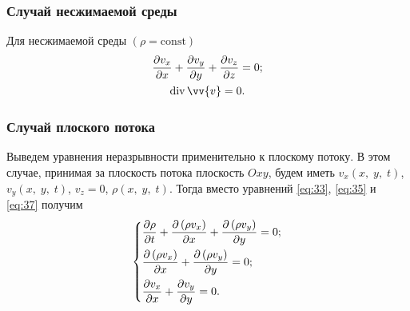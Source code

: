 	\subsubsection{Случай несжимаемой среды}
	Для несжимаемой среды $\left(\rho = \mathrm{const}\right)$
	\begin{gather}
		\frac{\pp v_x}{\pp x} + \frac{\pp v_y}{\pp y} + \frac{\pp v_z}{\pp z} = 0;\label{eq:37}\\
		\diverg\vv{v} = 0.\label{eq:38}
	\end{gather}
	
	\subsubsection{Случай плоского потока}
	Выведем уравнения неразрывности применительно к плоскому потоку. В этом случае, принимая за плоскость потока плоскость $Oxy$, будем иметь $v_x\left(x,\; y,\; t\right)$, $v_y\left(x,\; y,\; t\right)$, $v_z = 0$, $\rho\left(x,\; y,\; t\right)$. Тогда вместо уравнений \eqref{eq:33}, \eqref{eq:35} и \eqref{eq:37} получим
	\begin{gather}
		\begin{dcases}\label{eq:39}
			\frac{\partial\rho}{\partial t} + \frac{\partial\left(\rho v_x\right)}{\partial x} + \frac{\partial\left(\rho v_y\right)}{\partial y} = 0;\\
			\frac{\partial\left(\rho v_x\right)}{\partial x} + \frac{\partial\left(\rho v_y\right)}{\partial y} = 0;\\
			\frac{\partial v_x}{\partial x} + \frac{\partial v_y}{\partial y} = 0.
		\end{dcases}
	\end{gather}
	
